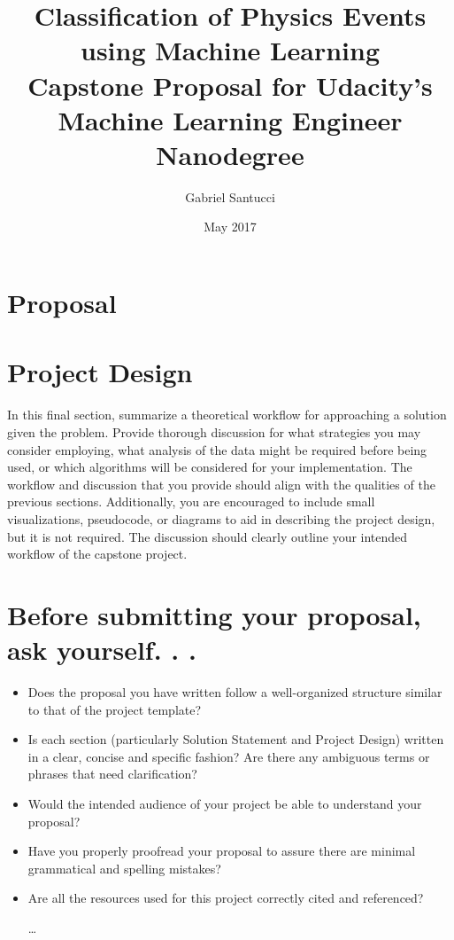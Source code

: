 \documentclass[11pt, oneside]{article}   	%
\title{Classification of Physics Events using Machine Learning\\
	\large Capstone Proposal for Udacity's Machine Learning Engineer Nanodegree}
\author{Gabriel Santucci}
\date{May 2017}
\begin{document}
\maketitle

\section*{Proposal}
 
 
 
 









\section{Project Design}

In this final section, summarize a theoretical workflow for approaching a solution given the problem. Provide thorough discussion for what strategies you may consider employing, what analysis of the data might be required before being used, or which algorithms will be considered for your implementation. The workflow and discussion that you provide should align with the qualities of the previous sections. Additionally, you are encouraged to include small visualizations, pseudocode, or diagrams to aid in describing the project design, but it is not required. The discussion should clearly outline your intended workflow of the capstone project.


\section{Before submitting your proposal, ask yourself. . .}

\begin{itemize}  
\item Does the proposal you have written follow a well-organized structure similar to that of the project template?
 
\item Is each section (particularly Solution Statement and Project Design) written in a clear, concise and specific fashion? Are there any ambiguous terms or phrases that need clarification?
 
\item Would the intended audience of your project be able to understand your proposal?

\item Have you properly proofread your proposal to assure there are minimal grammatical and spelling mistakes?

\item Are all the resources used for this project correctly cited and referenced?

\ldots 
\end{itemize}


\end{document}
